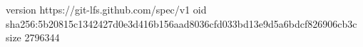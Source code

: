 version https://git-lfs.github.com/spec/v1
oid sha256:5b20815c1342427d0e3d416b156aad8036cfd033bd13e9d5a6bdcf826906cb3c
size 2796344

